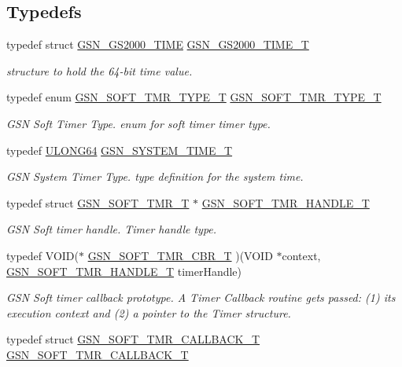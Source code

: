 \subsection*{Typedefs}
\begin{DoxyCompactItemize}
\item 
typedef struct \hyperlink{a00083}{GSN\_\-GS2000\_\-TIME} \hyperlink{a00673_gac2ea272727157e0cb9e61106986796ab}{GSN\_\-GS2000\_\-TIME\_\-T}
\begin{DoxyCompactList}\small\item\em structure to hold the 64-\/bit time value. \end{DoxyCompactList}\item 
typedef enum \hyperlink{a00673_ga599ea0a212c1bcd484a64610d070b5af}{GSN\_\-SOFT\_\-TMR\_\-TYPE\_\-T} \hyperlink{a00673_ga9a084f729d0bbf7175b1b4f1b1ed9f2e}{GSN\_\-SOFT\_\-TMR\_\-TYPE\_\-T}
\begin{DoxyCompactList}\small\item\em GSN Soft Timer Type. enum for soft timer timer type. \end{DoxyCompactList}\item 
typedef \hyperlink{a00660_ga28961430434ccabca6862ea93fe9a15b}{ULONG64} \hyperlink{a00673_gad1e755eb904493a09bf8df25a4519bf0}{GSN\_\-SYSTEM\_\-TIME\_\-T}
\begin{DoxyCompactList}\small\item\em GSN System Timer Type. type definition for the system time. \end{DoxyCompactList}\item 
typedef struct \hyperlink{a00229}{GSN\_\-SOFT\_\-TMR\_\-T} $\ast$ \hyperlink{a00673_gaf35989ebc15417c38bca69fd5c17cceb}{GSN\_\-SOFT\_\-TMR\_\-HANDLE\_\-T}
\begin{DoxyCompactList}\small\item\em GSN Soft timer handle. Timer handle type. \end{DoxyCompactList}\item 
typedef VOID($\ast$ \hyperlink{a00673_ga9bb74ab1272c117587bf1fadf84849de}{GSN\_\-SOFT\_\-TMR\_\-CBR\_\-T} )(VOID $\ast$context, \hyperlink{a00229}{GSN\_\-SOFT\_\-TMR\_\-HANDLE\_\-T} timerHandle)
\begin{DoxyCompactList}\small\item\em GSN Soft timer callback prototype. A Timer Callback routine gets passed: (1) its execution context and (2) a pointer to the Timer structure. \end{DoxyCompactList}\item 
typedef struct \hyperlink{a00228}{GSN\_\-SOFT\_\-TMR\_\-CALLBACK\_\-T} \hyperlink{a00673_ga0f3896e8f6fd92de3aa0d40428ffa23a}{GSN\_\-SOFT\_\-TMR\_\-CALLBACK\_\-T}

\end{DoxyCompactItemize}
